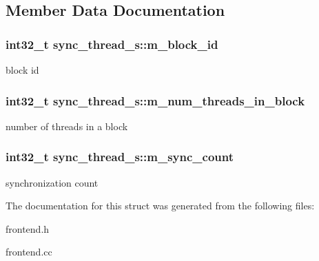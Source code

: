 \subsection{Member Data Documentation}
\hypertarget{structsync__thread__s_a8ea89f50640cc2dc347b2300718af6a8}{
\subsubsection[{m\_\-block\_\-id}]{\setlength{\rightskip}{0pt plus 5cm}int32\_\-t {\bf sync\_\-thread\_\-s::m\_\-block\_\-id}}}
\label{structsync__thread__s_a8ea89f50640cc2dc347b2300718af6a8}
block id \hypertarget{structsync__thread__s_a99f9d07e88d9a317cbeaea352765c10e}{
\subsubsection[{m\_\-num\_\-threads\_\-in\_\-block}]{\setlength{\rightskip}{0pt plus 5cm}int32\_\-t {\bf sync\_\-thread\_\-s::m\_\-num\_\-threads\_\-in\_\-block}}}
\label{structsync__thread__s_a99f9d07e88d9a317cbeaea352765c10e}
number of threads in a block \hypertarget{structsync__thread__s_a4ea69c583bd2a360fc81d0ef5484cf8c}{
\subsubsection[{m\_\-sync\_\-count}]{\setlength{\rightskip}{0pt plus 5cm}int32\_\-t {\bf sync\_\-thread\_\-s::m\_\-sync\_\-count}}}
\label{structsync__thread__s_a4ea69c583bd2a360fc81d0ef5484cf8c}
synchronization count 

The documentation for this struct was generated from the following files:\begin{DoxyCompactItemize}
\item 
frontend.h\item 
frontend.cc\end{DoxyCompactItemize}
